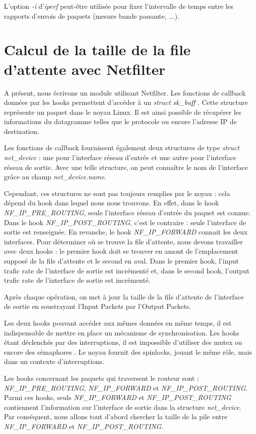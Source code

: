 \documentclass[a4paper]{article}
\begin{document}
L'option \textit{-i} d'\textit{iperf} peut-être utilisée
pour fixer l'intervalle de temps entre les rapports
d'envois de paquets (mesure bande passante, $\ldots$).

\section{Calcul de la taille de la file d'attente avec Netfilter}
A présent, nous écrivons un module utilisant Netfilter. Les
fonctions de callback données par les hooks permettent
d'accéder à un \textit{struct sk\_buff} \cite{skbuff}. Cette structure représente
un paquet dans le noyau Linux. Il est ainsi possible de récupérer
les informations du datagramme telles que le protocole ou encore
l'adresse IP de destination.

Les fonctions de callback fournissent également deux structures
de type \textit{struct net\_device} : une pour l'interface réseau
d'entrée et une autre pour l'interface réseau de sortie. Avec
une telle structure, on peut connaître le nom de l'interface
grâce au champ \textit{net\_device.name}.

Cependant, ces structures ne sont pas toujours remplies par le noyau : cela 
dépend du hook dans lequel nous nous trouvons. En effet, dans le hook \textit{NF\_IP\_PRE\_ROUTING}, 
seule l'interface réseau d'entrée du paquet est connue. Dans le hook \textit{NF\_IP\_POST\_ROUTING}, 
c'est le contraire : seule l'interface de sortie est renseignée. En revanche, le hook \textit{NF\_IP\_FORWARD} 
connait les deux interfaces.
Pour déterminer où se trouve la file d'attente, nous devons travailler avec deux hooks : 
le premier hook doit se trouver en amont de l'emplacement supposé de la file d'attente et le second en aval. 
Dans le premier hook, l'input trafic rate de l'interface de sortie est incrémenté et, dans le second hook, 
l'output trafic rate de l'interface de sortie est incrémenté.
 
Après chaque opération, on met à jour la taille de la file
d'attente de l'interface de sortie en soustrayant l'Input Packets par l'Output Packets.

Les deux hooks pouvant accéder aux mêmes données en même temps,
il est indispensable de mettre en place un mécanisme de
synchronisation. Les hooks étant déclenchés par des interruptions,
il est impossible d'utiliser des mutex ou encore des sémaphores \cite{mutex}.
Le noyau fournit des spinlocks, jouant le même rôle, mais dans
un contexte d'interruptions. \cite{lock}

Les hooks concernant les paquets qui traversent le routeur sont :
\textit{NF\_IP\_PRE\_ROUTING}, \textit{NF\_IP\_FORWARD} et
\textit{NF\_IP\_POST\_ROUTING}. Parmi ces hooks, seuls
\textit{NF\_IP\_FORWARD} et \textit{NF\_IP\_POST\_ROUTING}
contiennent l'information sur l'interface de sortie dans la
structure \textit{net\_device}. Par conséquent, nous allons
tout d'abord chercher la taille de la pile entre
\textit{NF\_IP\_FORWARD} et \textit{NF\_IP\_POST\_ROUTING}.
\end{document}
